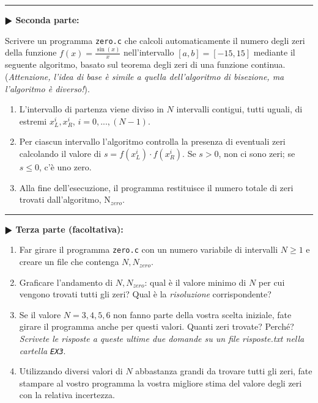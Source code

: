 \documentclass[11pt]{article}
\begin{document}
\hrule
\vspace{2mm}
\textbf{$\RHD$ Seconda parte:}

Scrivere un programma \texttt{zero.c} che calcoli automaticamente il numero degli zeri della funzione $f(x)=\frac{\sin(x)}{x}$ nell'intervallo $\left[a,b\right] = \left[-15,15 \right]$ mediante il seguente algoritmo,
basato sul teorema degli zeri di una funzione continua.
\\
({\em Attenzione, l'idea di base \`e simile a quella dell'algoritmo di bisezione,
ma l'algoritmo \`e diverso!}).
\begin{enumerate}
\item L'intervallo di partenza viene diviso in $N$ intervalli contigui,
tutti uguali, di estremi $x_L^{i}, x_R^{i}$, $i=0,...,(N-1)$.
\item Per ciascun intervallo l'algoritmo controlla la presenza di eventuali 
zeri calcolando il valore di $s=f(x_L^{i})\cdot f(x_R^i)$. Se $s>0$,
non ci sono zeri; se $s \le 0$, c'\`e uno zero.
\item Alla fine dell'esecuzione, il programma restituisce il numero totale di zeri
trovati dall'algoritmo, N$_{zero}$.
\end{enumerate}

\newpage

\hrule
\vspace{2mm}
\textbf{$\RHD$ Terza parte (facoltativa):}
\begin{enumerate}
\item Far girare il programma \texttt{zero.c} con un numero variabile di intervalli 
$N \ge 1$ e creare un file che contenga $N, N_{zero}$.
\item Graficare l'andamento di $N, N_{zero}$: qual \`e il valore minimo di $N$
per cui vengono trovati tutti gli zeri? Qual \`e la {\em risoluzione} corrispondente?
\item Se il valore $N=3,4,5,6$ non fanno parte della vostra scelta iniziale, fate girare il programma anche per questi valori. Quanti zeri trovate? Perch\'e? 
{\em Scrivete le risposte a queste ultime due domande su un file risposte.txt
nella cartella \texttt{EX3}}.
\item Utilizzando diversi valori di $N$ abbastanza grandi da trovare tutti gli zeri,
fate stampare al vostro programma la vostra migliore stima del valore degli zeri con la relativa incertezza.
\end{enumerate}
\end{document}
